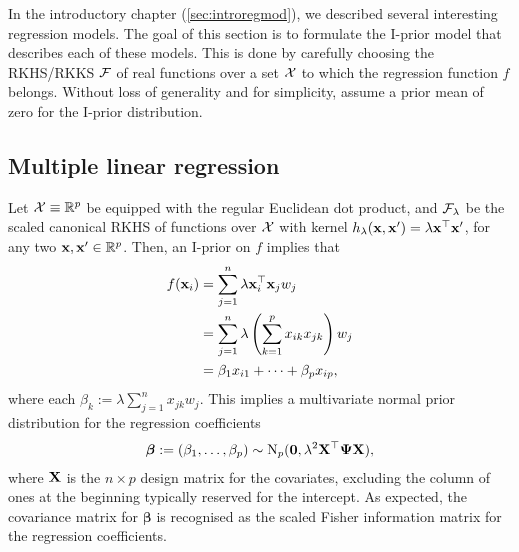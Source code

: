 In the introductory chapter (\cref{sec:introregmod}), we described several interesting regression models.
The goal of this section is to formulate the I-prior model that describes each of these models.
This is done by carefully choosing the RKHS/RKKS ${\mathcal F}$ of real functions over a set ${\mathcal X}$ to which the regression function $f$ belongs.
Without loss of generality and for simplicity, assume a prior mean of zero for the I-prior distribution.

\subsection{Multiple linear regression}

Let ${\mathcal X}\equiv \mathbb{R}^p$ be equipped with the regular Euclidean dot product, and ${\mathcal F}_\lambda$ be the scaled canonical RKHS of functions over ${\mathcal X}$ with kernel $h_\lambda({\mathbf x},{\mathbf x}') = \lambda {\mathbf x}^\top{\mathbf x}'$, for any two ${\mathbf x},{\mathbf x}'\in\mathbb{R}^p$. 
Then, an I-prior on $f$ implies that 
\begin{align*}
  f({\mathbf x}_i) &= \sum_{j=1}^n \lambda {\mathbf x}_i^\top{\mathbf x}_j w_j \\
  &= \sum_{j=1}^n \lambda \left( \sum_{k=1}^p x_{ik}x_{jk} \right) w_j \\
  &= \beta_1 x_{i1} + \dots + \beta_p x_{ip},
\end{align*}
where each $\beta_k := \lambda \sum_{j=1}^n  x_{jk}w_j$.
This implies a multivariate normal prior distribution for the regression coefficients   
\begin{align}\label{eq:ipriorcanonical}
  \boldsymbol\beta := (\beta_1,\dots,\beta_p) \sim \operatorname{N}_p({\mathbf 0}, \lambda^2 {\mathbf X}^\top {\bm\Psi} {\mathbf X}),
\end{align}
where ${\mathbf X}$ is the $n \times p$ design matrix for the covariates, excluding the column of ones at the beginning typically reserved for the intercept. 
As expected, the covariance matrix for $\boldsymbol\beta$ is recognised as the scaled Fisher information matrix for the regression coefficients.


